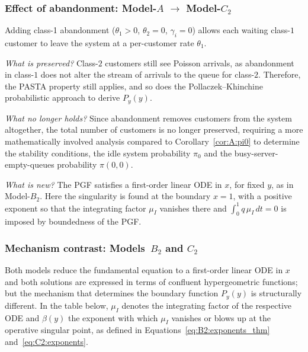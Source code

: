 \subsubsection*{Effect of abandonment: Model-\texorpdfstring{$A$}{A} \texorpdfstring{$\to$}{->} Model-\texorpdfstring{$C_2$}{C2}}

Adding class-1 abandonment ($\theta_1>0$, $\theta_2=0$, $\gamma_i=0$) allows each waiting class-$1$ customer to leave the system at a per-customer rate $\theta_1$.

\emph{What is preserved?} Class-$2$ customers still see Poisson arrivals, as abandonment in class-$1$ does not alter the stream of arrivals to the queue for class-$2$. Therefore, the PASTA property still applies, and so does the Pollaczek--Khinchine probabilistic approach to derive $P_y(y)$.

\emph{What no longer holds?} Since abandonment removes customers from the system altogether, the total number of customers is no longer preserved, requiring a more mathematically involved analysis compared to Corollary~\ref{cor:A:pi0} to determine the stability conditions, the idle system probability $\pi_0$ and the busy-server-empty-queues probability $\pi(0,0)$.

\emph{What is new?} The PGF satisfies a first-order linear ODE in $x$, for fixed $y$, as in Model-$B_2$. Here the singularity is found at the boundary $x=1$, with a positive exponent so that the integrating factor $\mu_I$ vanishes there and $\int_0^1 q\,\mu_I\,dt=0$ is imposed by boundedness of the PGF.

\subsubsection*{Mechanism contrast: Models~\texorpdfstring{$B_2$}{B2} and \texorpdfstring{$C_2$}{C2}}

Both models reduce the fundamental equation to a first-order linear ODE in $x$ and both solutions are expressed in terms of confluent hypergeometric functions; but the mechanism that determines the boundary function $P_y(y)$ is structurally different. In the table below, $\mu_I$ denotes the integrating factor of the respective ODE and $\beta(y)$ the exponent with which $\mu_I$ vanishes or blows up at the operative singular point, as defined in Equations~\eqref{eq:B2:exponents_thm} and~\eqref{eq:C2:exponents}.

